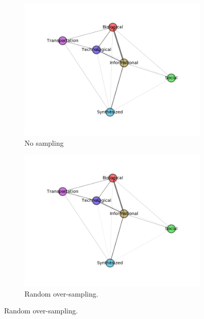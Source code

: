 \begin{figure}[H]
\begin{subfigure}{0.48\textwidth}
\includegraphics[width=\linewidth]{figs/similarity/Domain/None/g.png}
\caption{No sampling} \label{no_graph}
\end{subfigure}\hspace*{\fill}
\begin{subfigure}{0.48\textwidth}
\includegraphics[width=\linewidth]{figs/similarity/Domain/RandomOver/g.png}
\caption{Random over-sampling.} \label{random_over_graph}
\end{subfigure}


\end{figure}
